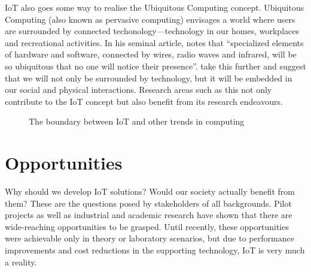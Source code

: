   IoT also goes some way to realise the Ubiquitous Computing concept. Ubiquitous Computing (also known as pervasive computing) envisages a world where users are surrounded by connected techonology---technology in our homes, workplaces and recreational activities. In his seminal article, \cite{Weiser:1999} notes that ``specialized elements of hardware and software, connected by wires, radio waves and infrared, will be so ubiquitous that no one will notice their presence''. \citet{Lyytinen:2002} take this further and suggest that we will not only be surrounded by technology, but it will be embedded in our social and physical interactions. Research areas such as this not only contribute to the IoT concept but also benefit from its research endeavours.

  \begin{figure}
    \centering
    \caption{The boundary between IoT and other trends in computing}\label{iotRelationship}
  \end{figure}

  \section{Opportunities}
    Why should we develop IoT solutions? Would our society actually benefit from them? These are the questions posed by stakeholders of all backgrounds. Pilot projects as well as industrial and academic research have shown that there are wide-reaching opportunities to be grasped. Until recently, these opportunities were achievable only in theory or laboratory scenarios, but due to performance improvements and cost reductions in the supporting technology, IoT is very much a reality.

